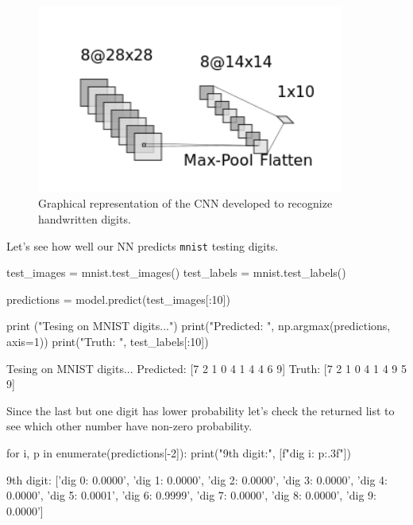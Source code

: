 \begin{figure}[htb]
\centering
\includegraphics[width=0.9\textwidth]{figures/cnn_2d}
\caption{Graphical representation of the CNN developed to recognize handwritten digits.}
\label{fig:cnn2d}
\end{figure}

Let's see how well our NN predicts \texttt{mnist} testing digits.

\begin{ipythonnon}
test_images = mnist.test_images()
test_labels = mnist.test_labels()

predictions = model.predict(test_images[:10])

print ("Tesing on MNIST digits...")
print("Predicted: ", np.argmax(predictions, axis=1)) 
print("Truth:     ", test_labels[:10])
\end{ipythonnon}
\begin{ioutput}
Tesing on MNIST digits...
Predicted:  [7 2 1 0 4 1 4 4 6 9]
Truth: [7 2 1 0 4 1 4 9 5 9]
\end{ioutput}

Since the last but one digit has lower probability let's check the returned list to see which other number have non-zero probability.

\begin{ipython}
for i, p in enumerate(predictions[-2]):
    print("9th digit:", [f"dig {i}: {p:.3f}"])
\end{ipython}
\begin{ioutput}
9th digit: ['dig 0: 0.0000', 'dig 1: 0.0000', 'dig 2: 0.0000', 
            'dig 3: 0.0000', 'dig 4: 0.0000', 'dig 5: 0.0001', 
            'dig 6: 0.9999', 'dig 7: 0.0000', 'dig 8: 0.0000', 
            'dig 9: 0.0000']
\end{ioutput}


